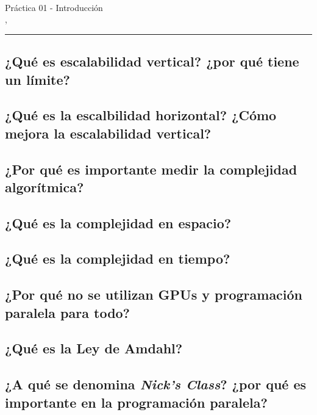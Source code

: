 



\begin{center}
  \LARGE\textbf{\coursename} \\
  \Large{Práctica 01 - Introducción} \\
  \normalsize{\currentsemester, \currentyear} \\
  \vspace{1em}
  \hrule
\end{center}

\setcounter{section}{1}



\newpage

\tableofcontents

\newpage

\subsection{¿Qué es escalabilidad vertical? ¿por qué tiene un límite?}

\subsection{¿Qué es la escalbilidad horizontal? ¿Cómo mejora la escalabilidad vertical?}

\subsection{¿Por qué es importante medir la complejidad algorítmica?}

\subsection{¿Qué es la complejidad en espacio?}

\subsection{¿Qué es la complejidad en tiempo?}

\subsection{¿Por qué no se utilizan GPUs y programación paralela para todo?}

\subsection{¿Qué es la Ley de Amdahl?}

\subsection{¿A qué se denomina \textit{Nick's Class}? ¿por qué es importante en la programación paralela?}





